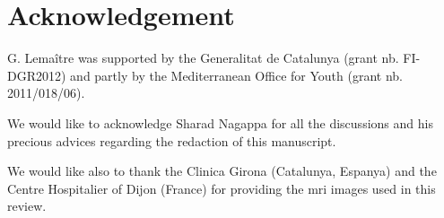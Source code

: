 \section{Acknowledgement} \label{sec:acknowledgement}

G. Lema\^itre was supported by the Generalitat de Catalunya (grant nb. FI-DGR2012) and partly by the Mediterranean Office for Youth (grant nb. 2011/018/06).

We would like to acknowledge Sharad Nagappa for all the discussions and his precious advices regarding the redaction of this manuscript.

We would like also to thank the Clinica Girona (Catalunya, Espanya) and the Centre Hospitalier of Dijon (France) for providing the \ac{mri} images used in this review.